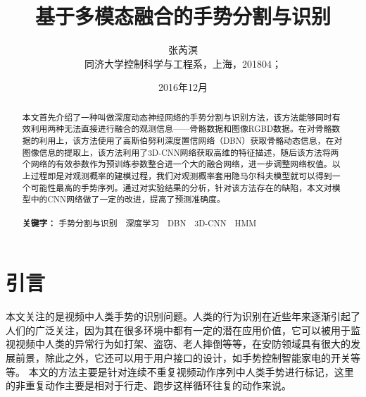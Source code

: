 \documentclass[a4paper, 12pt]{article}
\begin{document}
\newtheorem{example}{例}             %
\newtheorem{theorem}{定理}[section]  %
\newtheorem{definition}{定义}
\newtheorem{axiom}{公理}
\newtheorem{property}{性质}
\newtheorem{proposition}{命题}
\newtheorem{lemma}{引理}
\newtheorem{corollary}{推论}
\newtheorem{remark}{注解}
\newtheorem{condition}{条件}
\newtheorem{conclusion}{结论}
\newtheorem{assumption}{假设}

\renewcommand{\contentsname}{目录}  %
\renewcommand{\abstractname}{摘要}  %
\renewcommand{\refname}{参考文献}   %
\renewcommand{\indexname}{索引}
\renewcommand{\figurename}{图}
\renewcommand{\tablename}{表}
\renewcommand{\appendixname}{附录}
\renewcommand{\algorithmcfname}{算法} %

\title{基于多模态融合的手势分割与识别}
\author{张芮溟\\
 同济大学控制科学与工程系，上海，201804；\\[2ex]}
\date{2016年12月}

\maketitle

\begin{abstract}
  本文首先介绍了一种叫做深度动态神经网络的手势分割与识别方法，该方法能够同时有效利用两种无法直接进行融合的观测信息——骨骼数据和图像RGBD数据。在对骨骼数据的利用上，该方法使用了高斯伯努利深度置信网络（DBN）获取骨骼动态信息，在对图像信息的提取上，该方法利用了3D-CNN网络获取高维的特征描述，随后该方法将两个网络的有效参数作为预训练参数整合进一个大的融合网络，进一步调整网络权值。以上过程即是对观测概率的建模过程，我们对观测概率套用隐马尔科夫模型就可以得到一个可能性最高的手势序列。通过对实验结果的分析，针对该方法存在的缺陷，本文对模型中的CNN网络做了一定的改进，提高了预测准确度。
  \\
  \\
  \textbf{关键字：} 手势分割与识别~~深度学习~~DBN~~3D-CNN~~HMM
\end{abstract}

\section{引言}
本文关注的是视频中人类手势的识别问题。人类的行为识别在近些年来逐渐引起了人们的广泛关注，因为其在很多环境中都有一定的潜在应用价值，它可以被用于监视视频中人类的异常行为如打架、盗窃、老人摔倒等等，在安防领域具有很大的发展前景，除此之外，它还可以用于用户接口的设计，如手势控制智能家电的开关等等。
本文的方法主要是针对连续不重复视频动作序列中人类手势进行标记，这里的非重复动作主要是相对于行走、跑步这样循环往复的动作来说。
\end{document}
